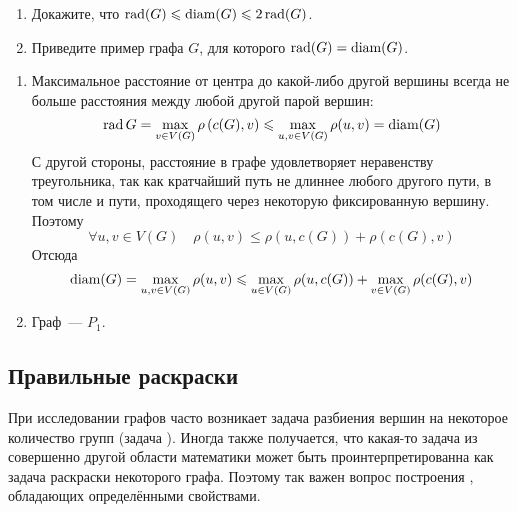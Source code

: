 \begin{Exercise}[counter=SecExercise, label={exercise:graphs:rad_and_diam}]
    \noindent
    \begin{enumerate}
        \item Докажите, что $ \operatorname{\textnormal{rad}}(G) \leqslant \operatorname{\textnormal{diam}}(G) \leqslant 2 \operatorname{\textnormal{rad}}(G) $.
        \item Приведите пример графа $ G $, для которого $ \operatorname{\textnormal{rad}}(G) = \operatorname{\textnormal{diam}}(G) $.
    \end{enumerate}
\end{Exercise}

\begin{Answer}
    \noindent
    \begin{enumerate}
        \item
            Максимальное расстояние от центра до какой-либо другой вершины всегда не больше расстояния между любой другой парой вершин:
            \[
                \operatorname{\textnormal{rad}} G = \max_{v \in V(G)} \rho\left( c(G), v \right) \leqslant \max_{u, v \in V(G)} \rho(u, v) = \operatorname{\textnormal{diam}}(G)
            \]
            С другой стороны, расстояние в графе удовлетворяет неравенству треугольника,
            так как кратчайший путь не длиннее любого другого пути, в том числе и пути,
            проходящего через некоторую фиксированную вершину.
            Поэтому
            \[
                \forall u, v \in V(G) \quad \rho(u, v) \leqslant \rho(u, c(G)) + \rho(c(G), v)
            \]
            Отсюда
            \[
                \operatorname{\textnormal{diam}}(G) = \max_{u, v \in V(G)} \rho(u, v) \leqslant \max_{u \in V(G)} \rho(u, c(G)) + \max_{v \in V(G)} \rho(c(G), v)
            \]
        \item Граф~--- $ P_1 $.
    \end{enumerate}
\end{Answer}



\subsection{Правильные раскраски}
\label{subsection:graphs:coloring}

При исследовании графов часто возникает задача разбиения вершин на некоторое количество групп (задача ).
Иногда также получается, что какая-то задача из совершенно другой области математики может быть проинтерпретированна как задача раскраски некоторого графа.
Поэтому так важен вопрос построения , обладающих определёнными свойствами. %

